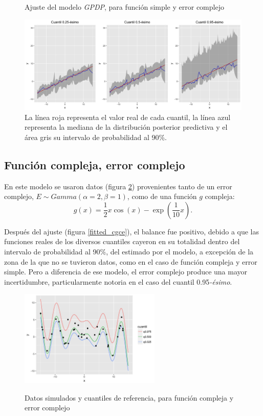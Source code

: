 \begin{figure}[H]
	\centering
	\caption{Ajuste del modelo \textit{GPDP}, para funci\'on simple y error complejo}
	\includegraphics[width=\textwidth]{Figures/Simulation/simple_g_complex_error/fitted_models.png}
	\captionsetup{singlelinecheck=off,font=footnotesize}
    \caption*{La l\'inea roja representa el valor real de cada cuantil, la l\'inea azul representa la mediana de la distribuci\'on posterior predictiva y el \'area gris su intervalo de probabilidad al 90\%.}
	\label{fitted_sgce}
\end{figure}

\subsection{Funci\'on compleja, error complejo}

En este modelo se usaron datos (figura \ref{sample_cgce}) provenientes tanto de un error complejo, $E \sim \textit{Gamma}(\alpha = 2,\beta = 1)$, como de una funci\'on $g$ compleja:
\begin{equation*}
    g(x) = \frac{1}{2} x \cos(x) - \exp\left(\frac{1}{10}x\right).
\end{equation*}

Despu\'es del ajuste (figura \ref{fitted_cgce}), el balance fue positivo, debido a que las funciones reales de los diversos cuantiles cayeron en su totalidad dentro del intervalo de probabilidad al 90\%, del estimado por el modelo, a excepci\'
on de la zona de la que no se tuvieron datos, como en el caso de funci\'on compleja y error simple. Pero a diferencia de ese modelo, el error complejo produce una mayor incertidumbre, particularmente notoria en el caso del cuantil 0.95\textit{-\'esimo}.

\begin{figure}[H]
	\centering
	\caption{Datos simulados y cuantiles de referencia, para funci\'on compleja y error complejo}
	\includegraphics[width=0.60\textwidth]{Figures/Simulation/complex_g_complex_error/sample.png}
	\label{sample_cgce}
\end{figure}

